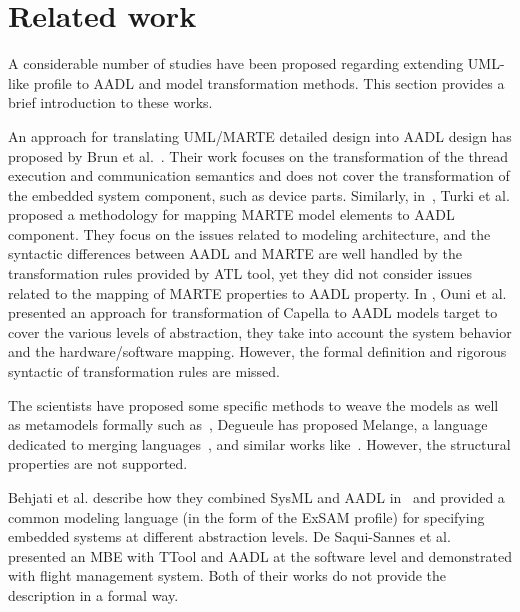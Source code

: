 
\section{Related work}\label{sec:rw}
A considerable number of studies have been proposed regarding extending UML-like profile to AADL and model transformation methods. This section provides a brief introduction to these works. 

An approach for translating UML/MARTE detailed design into AADL design has proposed by Brun et al.~\cite{brun2008uml}. Their work focuses on the transformation of the thread execution and communication semantics and does not cover the transformation of the embedded system component, such as device parts. Similarly, in~\cite{turki2010mapping}, Turki et al. proposed a methodology for mapping MARTE model elements to AADL component. They focus on the issues related to modeling architecture, and the syntactic differences between AADL and MARTE are well handled by the transformation rules provided by ATL tool, yet they did not consider issues related to the mapping of MARTE properties to AADL property. 
In \cite{Ouni:2016td}, Ouni et al. presented an approach for transformation of Capella to AADL models target to cover the various levels of abstraction, they take into account the system behavior and the hardware/software mapping. However, the formal definition and rigorous syntactic of transformation rules are missed. 

The scientists have proposed some specific methods to weave the models as well as metamodels formally such as~\cite{Jezequel:2008ik}, Degueule has proposed Melange, a language dedicated to merging languages~\cite{degueule2015melange}, and similar works like~\cite{ramos2007matching}. However, the structural properties are not supported.  

Behjati et al. describe how they combined SysML and AADL in~\cite{behjati2011extending} and provided a common modeling language (in the form of the ExSAM profile) for specifying embedded systems at different abstraction levels. De Saqui-Sannes et al. \cite{de2012combining} presented an MBE with TTool and AADL at the software level and demonstrated with flight management system. Both of their works do not provide the description in a formal way.


